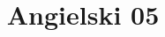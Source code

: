 \documentclass[a4paper,12pt]{article}
\title{Angielski 05}
\author{}
\begin{document}
\maketitle

\begin{abstract}

\end{abstract}
\end{document}
